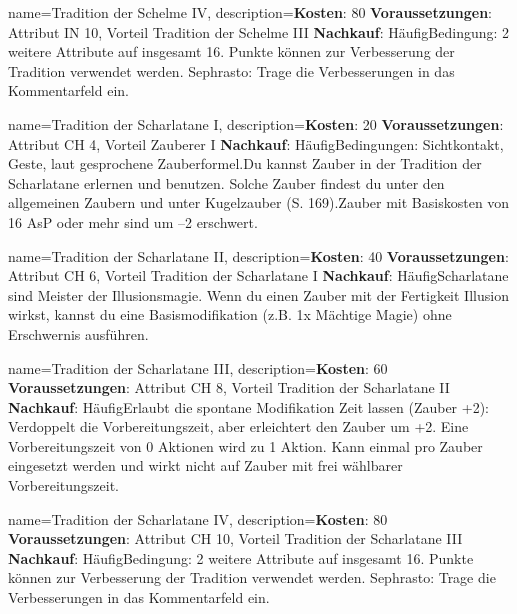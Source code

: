 {
    name={Tradition der Schelme IV},
    description={\textbf{Kosten}: 80 \textbf{Voraussetzungen}: Attribut IN 10, Vorteil Tradition der Schelme III \textbf{Nachkauf}: Häufig\newline Bedingung: 2 weitere Attribute auf insgesamt 16. Punkte können zur Verbesserung der Tradition verwendet werden. Sephrasto: Trage die Verbesserungen in das Kommentarfeld ein.}
}


{
    name={Tradition der Scharlatane I},
    description={\textbf{Kosten}: 20 \textbf{Voraussetzungen}: Attribut CH 4, Vorteil Zauberer I \textbf{Nachkauf}: Häufig\newline Bedingungen: Sichtkontakt, Geste, laut gesprochene Zauberformel.\newline Du kannst Zauber in der Tradition der Scharlatane erlernen und benutzen. Solche Zauber findest du unter den allgemeinen Zaubern und unter Kugelzauber (S. 169).\newline Zauber mit Basiskosten von 16 AsP oder mehr sind um –2 erschwert.}
}


{
    name={Tradition der Scharlatane II},
    description={\textbf{Kosten}: 40 \textbf{Voraussetzungen}: Attribut CH 6, Vorteil Tradition der Scharlatane I \textbf{Nachkauf}: Häufig\newline Scharlatane sind Meister der Illusionsmagie. Wenn du einen Zauber mit der Fertigkeit Illusion wirkst, kannst du eine Basismodifikation (z.B. 1x Mächtige Magie) ohne Erschwernis ausführen.}
}


{
    name={Tradition der Scharlatane III},
    description={\textbf{Kosten}: 60 \textbf{Voraussetzungen}: Attribut CH 8, Vorteil Tradition der Scharlatane II \textbf{Nachkauf}: Häufig\newline Erlaubt die spontane Modifikation Zeit lassen (Zauber +2): Verdoppelt die Vorbereitungszeit, aber erleichtert den Zauber um +2. Eine Vorbereitungszeit von 0 Aktionen wird zu 1 Aktion. Kann einmal pro Zauber eingesetzt werden und wirkt nicht auf Zauber mit frei wählbarer Vorbereitungszeit.}
}


{
    name={Tradition der Scharlatane IV},
    description={\textbf{Kosten}: 80 \textbf{Voraussetzungen}: Attribut CH 10, Vorteil Tradition der Scharlatane III \textbf{Nachkauf}: Häufig\newline Bedingung: 2 weitere Attribute auf insgesamt 16. Punkte können zur Verbesserung der Tradition verwendet werden. Sephrasto: Trage die Verbesserungen in das Kommentarfeld ein.}
}


